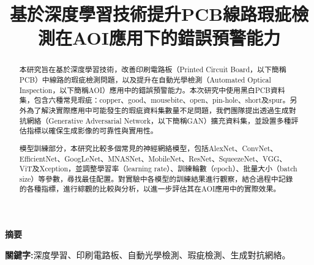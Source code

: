 \title{\fontsize{14}{0} \bf 基於深度學習技術提升PCB線路瑕疵檢測在AOI應用下的錯誤預警能力}
\author{
}
\maketitle %
\begin{flushleft}
  {\fontsize{12}{0} \bf 摘要}
\end{flushleft}
%
%
\begin{abstract}
  \hspace{2em}
  本研究旨在基於深度學習技術，改善印刷電路板（Printed Circuit Board，以下簡稱PCB）中線路的瑕疵檢測問題，以及提升在自動光學檢測（Automated Optical Inspection，以下簡稱AOI）應用中的錯誤預警能力。本次研究中使用黑白PCB資料集，包含六種常見瑕疵：copper、good、mousebite、open、pin-hole、short及spur。另外為了解決實際應用中可能發生的瑕疵資料集數量不足問題，我們團隊提出透過生成對抗網絡（Generative Adversarial Network，以下簡稱GAN）擴充資料集，並設置多種評估指標以確保生成影像的可靠性與實用性。
\end{abstract}
\begin{abstract}
  \hspace{2em}
  模型訓練部分，本研究比較多個常見的神經網絡模型，包括AlexNet、ConvNet、EfficientNet、GoogLeNet、MNASNet、MobileNet、ResNet、SqueezeNet、VGG、ViT及Xception，並調整學習率（learning rate）、訓練輪數（epoch）、批量大小（batch size）等參數，尋找最佳配置。對實驗中各模型的訓練結果進行觀察，結合過程中記錄的各種指標，進行綜觀的比較與分析，以進一步評估其在AOI應用中的實際效果。
\end{abstract}
\begin{IEEEkeywords}
    {\fontsize{10}{0} \bf 關鍵字:}深度學習、印刷電路板、自動光學檢測、瑕疵檢測、生成對抗網絡。
\end{IEEEkeywords}
\IEEEpeerreviewmaketitle
